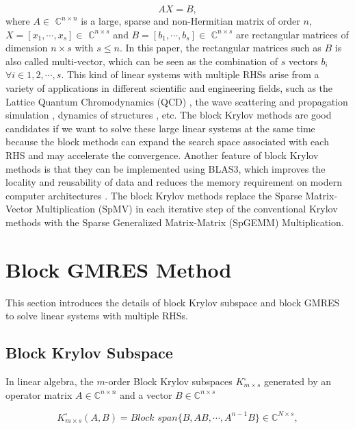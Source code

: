 \begin{equation}
\label{AX=B}
AX =  B,
\end{equation}
where $A \in$ $\mathbb{C}^{n \times n}$ is a large, sparse and non-Hermitian matrix of order $n$, $X=[x_1,\cdots,x_s] \in$  $\mathbb{C}^{n \times s}$ and $B=[b_1,\cdots,b_s] \in$  $\mathbb{C}^{n \times s}$ are rectangular matrices of dimension $n \times s$ with $s \leq n$. In this paper, the rectangular matrices such as $B$ is also called multi-vector, which can be seen as the combination of $s$ vectors $b_i$ $\forall i \in 1, 2, \cdots, s$. This kind of linear systems with multiple RHSs arise from a variety of applications in different scientific and engineering fields, such as the Lattice Quantum Chromodynamics (QCD) \cite{sakurai2010application, nakamura2012modified, fiebach1997variants}, the wave scattering and propagation simulation \cite{malhotra1997iterative}, dynamics of structures \cite{barbella2011block, ferraz2001block, nour1985short}, etc. The block Krylov methods are good candidates if we want to solve these large linear systems at the same time because the block methods can expand the search space associated with each RHS and may accelerate the convergence. Another feature of block Krylov methods is that they can be implemented using BLAS3, which improves the locality and reusability of data and reduces the memory requirement on modern computer architectures \cite{agullo2014block}. The block Krylov methods replace the Sparse Matrix-Vector Multiplication (SpMV) in each iterative step of the conventional Krylov methods with the Sparse Generalized Matrix-Matrix (SpGEMM) Multiplication.


\section{Block GMRES Method}

This section introduces the details of block Krylov subspace and block GMRES to solve linear systems with multiple RHSs.

\subsection{Block Krylov Subspace}

In linear algebra, the $m$-order Block Krylov subspaces $K_{m\times s}^{\square}$ \cite{gutknecht2006block} generated by an operator matrix $A \in \mathbb{C}^{n\times n}$ and a vector $B \in \mathbb{C}^{n\times s}$ 

\begin{equation}
K_{m\times s}^{\square}(A,B)=\textit{Block span}\{B, AB, \cdots, A^{n-1}B\} \in \mathbb{C}^{N \times s},
\end{equation}

